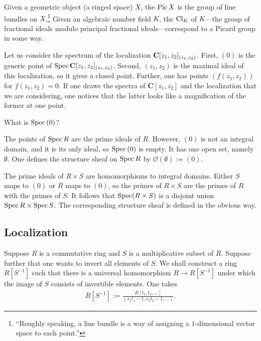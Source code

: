 \documentclass [11 pt, oneside] {article}
\begin{document}
\begin{remark}
	Given a geometric object (a ringed space) $X$, the  $\operatorname{Pic} X$ is the group of line bundles on $X$.\footnote{``Roughly speaking, a line bundle is a way of assigning a $1$-dimensional vector space to each point.''} Given an algebraic number field $K$, the  $\operatorname{Cl}_K$ of $K$---the group of fractional ideals modulo principal fractional ideals---correspond to a Picard group in some way.
\end{remark}

\begin{example}[ ]\label{}\text{}
Let us consider the spectrum of the localization $\mathbf C[z_1,z_2]_{(z_1,z_2)}$. First, $(0)$ is the generic point of $\operatorname{Spec} \mathbf C[z_1,z_2]_{(z_1,z_2)}$. Second, $(z_1,z_2)$ is the maximal ideal of this localization, so it gives a closed point. Further, one has points $(f(z_1,z_2))$ for $f(z_1,z_2)=0$. If one draws the spectra of $\mathbf{C}[z_1,z_2]$ and the localization that we are considering, one notices that the latter looks like a magnification of the former at one point.
\end{example}

\begin{problem}
	What is $\operatorname{Spec} \text{}(0)$?
\end{problem}

The points of $\operatorname{Spec} R$ are the prime ideals of $R$. However, $(0)$ is not an integral domain, and it is its only ideal, so $\operatorname{Spec} \text{}(0)$ is empty. It has one open set, namely $\emptyset$. One defines the structure sheaf on $\operatorname{Spec} R$ by $\mathscr{O}(\emptyset) :=  (0)$.

\begin{example}
	The prime ideals of $R\times S$ are homomorphisms to integral domains. Either $S$ maps to $(0)$ or $R$ maps to $(0)$, so the primes of $R\times S$ are the primes of $R$ with the primes of $S$. It follows that $\operatorname{Spec} (R\times S)$ is a disjoint union $\operatorname{Spec} R\times \operatorname{Spec} S$. The corresponding structure sheaf is defined in the obvious way.
\end{example}

\subsection{Localization}
Suppose $R$ is a commutative ring and $S$ is a multiplicative subset of $R$. Suppose further that one wants to invert all elements of $S$. We shall construct a ring $R[S^{-1}]$ such that there is a universal homomorphism $R\longrightarrow R[S^{-1}]$ under which the image of $S$ consists of invertible elements. One takes
\begin{align*}
	R[S^{-1}] := \frac{R[t_1,t_2,\hdots]}{(s_1t_1-1,s_2t_2-1,\hdots)}.
\end{align*}
\end{document}
